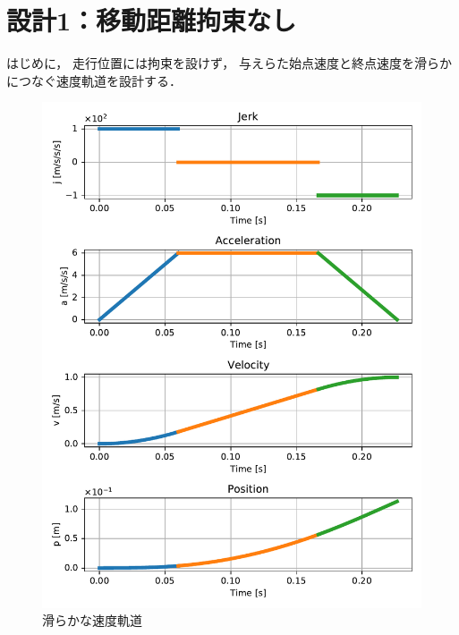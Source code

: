 \documentclass[a5paper]{ltjsarticle}
\begin{document}
\section{設計1：移動距離拘束なし}
はじめに，
走行位置には拘束を設けず，
与えらた始点速度と終点速度を滑らかにつなぐ速度軌道を設計する．
\begin{figure}[htbp]
    \centering
    \includegraphics[width=0.8\linewidth]{figs/accel_curve.pdf}
    \caption{滑らかな速度軌道}
\end{figure}
\end{document}
